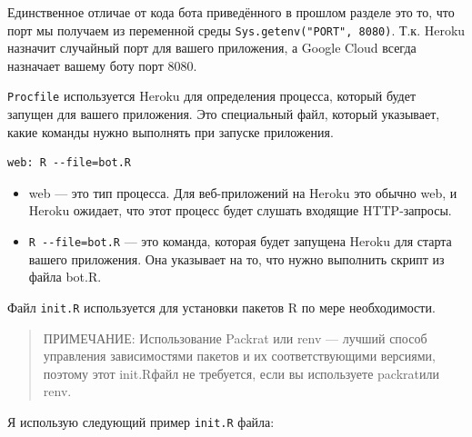 \documentclass[
]{book}
\newenvironment{Shaded}{\begin{snugshade}}{\end{snugshade}}
\newcommand{\AttributeTok}[1]{\textcolor[rgb]{0.13,0.29,0.53}{#1}}
\newcommand{\CommentTok}[1]{\textcolor[rgb]{0.56,0.35,0.01}{\textit{#1}}}
\newcommand{\DecValTok}[1]{\textcolor[rgb]{0.00,0.00,0.81}{#1}}
\newcommand{\FunctionTok}[1]{\textcolor[rgb]{0.13,0.29,0.53}{\textbf{#1}}}
\newcommand{\NormalTok}[1]{#1}
\newcommand{\OtherTok}[1]{\textcolor[rgb]{0.56,0.35,0.01}{#1}}
\newcommand{\SpecialCharTok}[1]{\textcolor[rgb]{0.81,0.36,0.00}{\textbf{#1}}}
\newcommand{\StringTok}[1]{\textcolor[rgb]{0.31,0.60,0.02}{#1}}
\providecommand{\tightlist}{%
  \setlength{\itemsep}{0pt}\setlength{\parskip}{0pt}}
\begin{document}
\begin{Shaded}
\end{Shaded}

Единственное отличае от кода бота приведённого в прошлом разделе это то, что порт мы получаем из переменной среды \texttt{Sys.getenv("PORT",\ 8080)}. Т.к. Heroku назначит случайный порт для вашего приложения, а Google Cloud всегда назначает вашему боту порт 8080.

\texttt{Procfile} используется Heroku для определения процесса, который будет запущен для вашего приложения. Это специальный файл, который указывает, какие команды нужно выполнять при запуске приложения.

\begin{verbatim}
web: R --file=bot.R
\end{verbatim}

\begin{itemize}
\tightlist
\item
  web --- это тип процесса. Для веб-приложений на Heroku это обычно web, и Heroku ожидает, что этот процесс будет слушать входящие HTTP-запросы.
\item
  \texttt{R\ -\/-file=bot.R} --- это команда, которая будет запущена Heroku для старта вашего приложения. Она указывает на то, что нужно выполнить скрипт из файла bot.R.
\end{itemize}

Файл \texttt{init.R} используется для установки пакетов R по мере необходимости.

\begin{quote}
ПРИМЕЧАНИЕ: Использование Packrat или renv --- лучший способ управления зависимостями пакетов и их соответствующими версиями, поэтому этот init.Rфайл не требуется, если вы используете packratили renv.
\end{quote}

Я использую следующий пример \texttt{init.R} файла:
\end{document}
